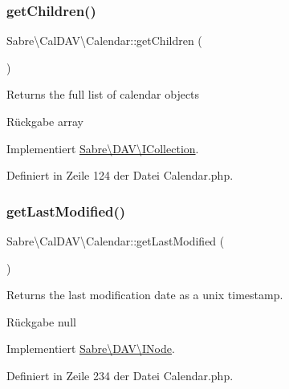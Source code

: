 \subsubsection{\texorpdfstring{get\+Children()}{getChildren()}}
{\footnotesize\ttfamily Sabre\textbackslash{}\+Cal\+D\+A\+V\textbackslash{}\+Calendar\+::get\+Children (\begin{DoxyParamCaption}{ }\end{DoxyParamCaption})}

Returns the full list of calendar objects

\begin{DoxyReturn}{Rückgabe}
array 
\end{DoxyReturn}


Implementiert \mbox{\hyperlink{interface_sabre_1_1_d_a_v_1_1_i_collection_a5344a6890e49fd7a81bb0e38b4c6d0be}{Sabre\textbackslash{}\+D\+A\+V\textbackslash{}\+I\+Collection}}.



Definiert in Zeile 124 der Datei Calendar.\+php.

\mbox{\label{class_sabre_1_1_cal_d_a_v_1_1_calendar_a8edaf2f01edea7d84f31ef0500ce54ea}} 
\subsubsection{\texorpdfstring{get\+Last\+Modified()}{getLastModified()}}
{\footnotesize\ttfamily Sabre\textbackslash{}\+Cal\+D\+A\+V\textbackslash{}\+Calendar\+::get\+Last\+Modified (\begin{DoxyParamCaption}{ }\end{DoxyParamCaption})}

Returns the last modification date as a unix timestamp.

\begin{DoxyReturn}{Rückgabe}
null 
\end{DoxyReturn}


Implementiert \mbox{\hyperlink{interface_sabre_1_1_d_a_v_1_1_i_node_a06335f81c7d4ec2c6d9e327c8ce61014}{Sabre\textbackslash{}\+D\+A\+V\textbackslash{}\+I\+Node}}.



Definiert in Zeile 234 der Datei Calendar.\+php.

